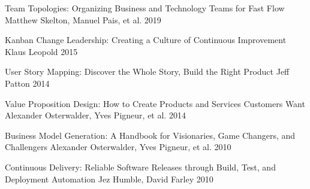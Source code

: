 
\begin{cvbooks}

  \cvbook
    {Team Topologies: Organizing Business and Technology Teams for Fast Flow}
    {Matthew Skelton, Manuel Pais, et al.}
    {2019}

  \cvbook
    {Kanban Change Leadership: Creating a Culture of Continuous Improvement}
    {Klaus Leopold}
    {2015}

  \cvbook
    {User Story Mapping: Discover the Whole Story, Build the Right Product}
    {Jeff Patton}
    {2014}

  \cvbook
    {Value Proposition Design: How to Create Products and Services Customers Want}
    {Alexander Osterwalder, Yves Pigneur, et al.}
    {2014}

  \cvbook
    {Business Model Generation: A Handbook for Visionaries, Game Changers, and Challengers}
    {Alexander Osterwalder, Yves Pigneur, et al.}
    {2010}

  \cvbook
    {Continuous Delivery: Reliable Software Releases through Build, Test, and Deployment Automation}
    {Jez Humble, David Farley}
    {2010}

\end{cvbooks}
